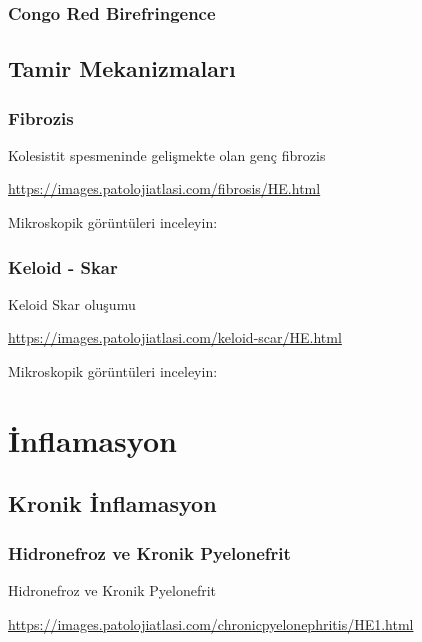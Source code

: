 \documentclass[
  letterpaper,
  DIV=11,
  numbers=noendperiod]{scrreprt}
\begin{document}
\hypertarget{congo-red-birefringence}{%
\section{Congo Red Birefringence}\label{congo-red-birefringence}}

\hypertarget{tamir-mekanizmalarux131}{%
\chapter{Tamir Mekanizmaları}\label{tamir-mekanizmalarux131}}

\hypertarget{fibrozis}{%
\section{Fibrozis}\label{fibrozis}}

Kolesistit spesmeninde gelişmekte olan genç fibrozis

\url{https://images.patolojiatlasi.com/fibrosis/HE.html}

Mikroskopik görüntüleri inceleyin:

\hypertarget{keloid---skar}{%
\section{Keloid - Skar}\label{keloid---skar}}

Keloid Skar oluşumu

\url{https://images.patolojiatlasi.com/keloid-scar/HE.html}

Mikroskopik görüntüleri inceleyin:

\part{İnflamasyon}

\hypertarget{kronik-inflamasyon}{%
\chapter{Kronik İnflamasyon}\label{kronik-inflamasyon}}

\hypertarget{hidronefroz-ve-kronik-pyelonefrit}{%
\section{Hidronefroz ve Kronik
Pyelonefrit}\label{hidronefroz-ve-kronik-pyelonefrit}}

Hidronefroz ve Kronik Pyelonefrit

\url{https://images.patolojiatlasi.com/chronicpyelonephritis/HE1.html}
\end{document}
